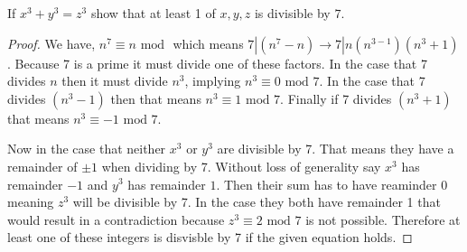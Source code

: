 \documentclass[11pt]{article}
\newenvironment{problem}[2][Problem\!]{\begin{trivlist}
\item[\hskip \labelsep {\bfseries #1}\hskip \labelsep {\bfseries #2}]}{\end{trivlist}}
\begin{document}
\begin{tcolorbox}
  \begin{problem} {IC | 11/10 | 136.} If $x^{3} + y^{3} = z^{3}$ show that at least 1 of $x,y,z$ is divisible by $7$.    
  \end{problem}
\end{tcolorbox}
\begin{proof}
  We have, $n^{7} \equiv n \text{ mod }$ which means $7| (n^{7}-n) \rightarrow 7|n(n^{3-1})(n^{3} + 1)$. Because 7 is a prime it must divide one of these factors. In the case that 7 divides $n$ then it must divide $n^{3}$, implying $n^{3} \equiv 0 \text{ mod }7$. In the case that 7 divides $(n^{3}-1)$ then that means $n^{3} \equiv 1 \text{ mod }7 $. Finally if 7 divides $(n^{3} + 1)$ that means $n^{3} \equiv -1 \text{ mod }7$. 

  Now in the case that neither $x^{3}$ or $y^{3}$ are divisible by 7. That means they have a remainder of $\pm 1$ when dividing by 7. Without loss of generality say $x^{3}$ has remainder $-1$ and $y^{3}$ has remainder $1$. Then their sum has to have reaminder 0 meaning $z^{3}$ will be divisible by 7. In the case they both have remainder 1 that would result in a contradiction because $z^{3} \equiv 2 \text{ mod }7$ is not possible. Therefore at least one of these integers is disvisble by 7 if the given equation holds. 
\end{proof}
\end{document}
